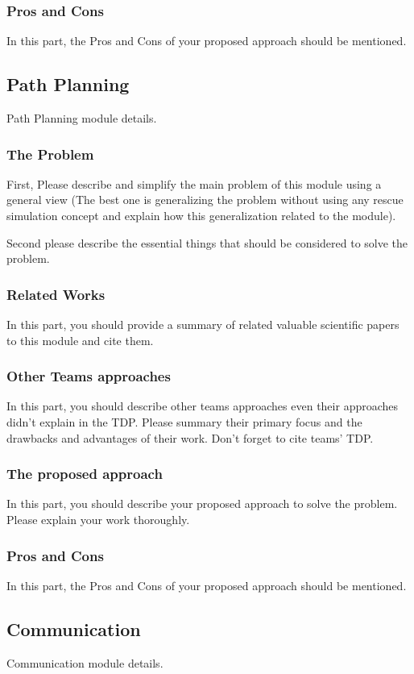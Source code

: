 \documentclass[runningheads,a4paper]{llncs}
\begin{document}
\subsubsection{Pros and Cons}
In this part, the Pros and Cons of your proposed approach should be mentioned.
\subsection{Path Planning}
Path Planning module details.
\subsubsection{The Problem}
First, Please describe and simplify the main problem of this module using a general view (The best one is generalizing the problem without using any rescue simulation concept and explain how this generalization related to the module).

Second please describe the essential things that should be considered to solve the problem.
\subsubsection{Related Works}
In this part, you should provide a summary of related valuable scientific papers to this module and cite them.
\subsubsection{Other Teams approaches}
In this part, you should describe other teams approaches even their approaches didn't explain in the TDP. Please summary their primary focus and the drawbacks and advantages of their work. Don't forget to cite teams' TDP.
\subsubsection{The proposed approach}
In this part, you should describe your proposed approach to solve the problem. Please explain your work thoroughly.
\subsubsection{Pros and Cons}
In this part, the Pros and Cons of your proposed approach should be mentioned.

\subsection{Communication}
Communication module details.
\end{document}
